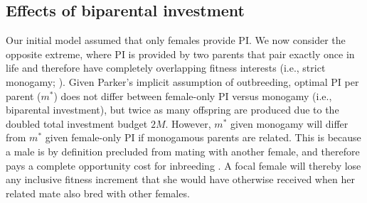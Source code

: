 \documentclass[12pt]{article}
\begin{document}
\subsection*{Effects of biparental investment}

Our initial model assumed that only females provide PI. We now consider the opposite extreme, where PI is provided by two parents that pair exactly once in life and therefore have completely overlapping fitness interests (i.e., strict monogamy; \cite{Parker1985}). Given Parker's \cite{Parker1985} implicit assumption of outbreeding, optimal PI per parent ($m^{*}$) does not differ between female-only PI versus monogamy (i.e., biparental investment), but twice as many offspring are produced due to the doubled total investment budget $2M$. However, $m^{*}$ given monogamy will differ from $m^{*}$ given female-only PI if monogamous parents are related. This is because a male is by definition precluded from mating with another female, and therefore pays a complete opportunity cost for inbreeding \cite[][]{Waser1986}. A focal female will thereby lose any inclusive fitness increment that she would have otherwise received when her related mate also bred with other females.
\end{document}
